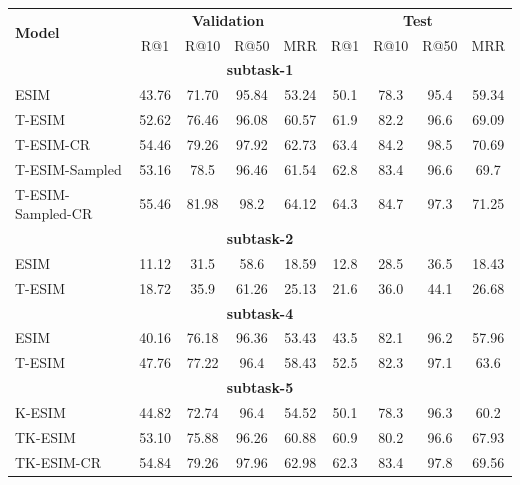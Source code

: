 \documentclass[letterpaper]{article} %
\begin{document}
\begin{table}[htbp!]
\begin{center}
\begin{tabular}{lcccc|cccc}
    \hline
    \multirow{2}{*}{\textbf{Model}} & \multicolumn{4}{c}{\textbf{Validation}} & \multicolumn{4}{c}{\textbf{Test}}\\
     & R@1 & R@10 & R@50 & MRR & R@1 & R@10 & R@50 & MRR  \\ \hline
    \multicolumn{9}{c}{\textbf{subtask-1}}\\\hline
    ESIM & 43.76 & 71.70 & 95.84 & 53.24 &  50.1 & 78.3 & 95.4 & 59.34 \\ \hline
    T-ESIM & 52.62 & 76.46 & 96.08 & 60.57 & 61.9 & 82.2 & 96.6 & 69.09\\ \hline
    T-ESIM-CR & 54.46 & 79.26 & 97.92 & 62.73 & 63.4 & 84.2 & 98.5 & 70.69\\ \hline
    T-ESIM-Sampled & 53.16 & 78.5 & 96.46 & 61.54 & 62.8 & 83.4 & 96.6 & 69.7\\ \hline
    T-ESIM-Sampled-CR & 55.46 & 81.98 & 98.2 & 64.12 & 64.3 & 84.7 & 97.3 & 71.25\\ \hline
    \multicolumn{9}{c}{\textbf{subtask-2}}\\\hline
    ESIM & 11.12 & 31.5 & 58.6 & 18.59 &  12.8 & 28.5 & 36.5 & 18.43 \\ \hline
    T-ESIM & 18.72 & 35.9 & 61.26 & 25.13 & 21.6 & 36.0 & 44.1 & 26.68 \\ \hline
    \multicolumn{9}{c}{\textbf{subtask-4}}\\\hline
    ESIM & 40.16 & 76.18 & 96.36 & 53.43 &  43.5 & 82.1 & 96.2 & 57.96 \\ \hline
    T-ESIM & 47.76 & 77.22 & 96.4 & 58.43 & 52.5 & 82.3 & 97.1 & 63.6 \\ \hline
    \multicolumn{9}{c}{\textbf{subtask-5}}\\\hline
    K-ESIM & 44.82 & 72.74 & 96.4 & 54.52 &  50.1 & 78.3 & 96.3 & 60.2 \\ \hline
    TK-ESIM & 53.10 & 75.88 & 96.26 & 60.88 & 60.9 & 80.2 & 96.6 & 67.93 \\ \hline
    TK-ESIM-CR & 54.84 & 79.26 & 97.96 & 62.98 & 62.3 & 83.4 & 97.8 & 69.56\\ \hline


\end{tabular}
\end{center}
\end{table}
\end{document}
